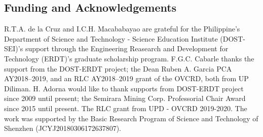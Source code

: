 \documentclass[smallextended]{svjour3}
\begin{document}
\subsection*{Funding and Acknowledgements}
R.T.A. de la Cruz and I.C.H. Macababayao  are grateful for the Philippine's Department of Science and Technology - Science Education Institute (DOST-SEI)'s support 
through the Engineering Reasearch and Development for Technology (ERDT)'s graduate scholarship program.
F.G.C. Cabarle thanks the support from the DOST-ERDT project; the Dean Ruben A. Garcia PCA AY2018--2019, and an RLC AY2018--2019 grant of the OVCRD, both from UP Diliman.
H. Adorna would like to thank supports from DOST-ERDT project since 2009 until present; the Semirara Mining Corp. Professorial Chair Award since 2015 until present. The RLC  grant from UPD - OVCRD 2019-2020.
The work was supported by the Basic Research Program of Science and Technology of Shenzhen (JCYJ20180306172637807).




\end{document}
